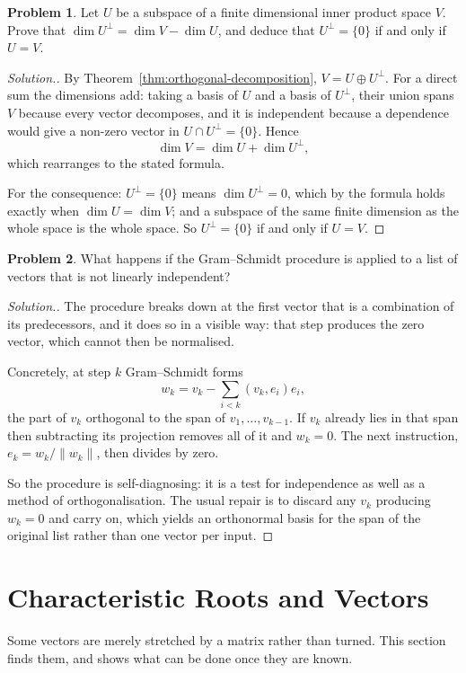 \documentclass[11pt,a4paper]{article}
\theoremstyle{definition}
\newtheorem{problemx}{Problem}[section]
\newenvironment{problem}{\begin{problemx}}{\end{problemx}}
\newenvironment{solution}
  {\renewcommand{\qedsymbol}{}\begin{proof}[\textit{Solution}.]}
  {\end{proof}}
\begin{document}
\begin{problem}
Let $U$ be a subspace of a finite dimensional inner product space $V$. Prove
that $\dim U^{\perp}=\dim V-\dim U$, and deduce that $U^{\perp}=\{0\}$ if and
only if $U=V$.
\end{problem}
\begin{solution}
By Theorem~\ref{thm:orthogonal-decomposition}, $V=U\oplus U^{\perp}$. For a
direct sum the dimensions add: taking a basis of $U$ and a basis of
$U^{\perp}$, their union spans $V$ because every vector decomposes, and it is
independent because a dependence would give a non-zero vector in
$U\cap U^{\perp}=\{0\}$. Hence
$$\dim V=\dim U+\dim U^{\perp},$$
which rearranges to the stated formula.

For the consequence: $U^{\perp}=\{0\}$ means $\dim U^{\perp}=0$, which by the
formula holds exactly when $\dim U=\dim V$; and a subspace of the same finite
dimension as the whole space is the whole space. So $U^{\perp}=\{0\}$ if and
only if $U=V$.
\end{solution}

\begin{problem}
What happens if the Gram--Schmidt procedure is applied to a list of vectors
that is not linearly independent?
\end{problem}
\begin{solution}
The procedure breaks down at the first vector that is a combination of its
predecessors, and it does so in a visible way: that step produces the zero
vector, which cannot then be normalised.

Concretely, at step $k$ Gram--Schmidt forms
$$w_k=v_k-\sum_{i<k}(v_k,e_i)e_i,$$
the part of $v_k$ orthogonal to the span of $v_1,\dots,v_{k-1}$. If $v_k$
already lies in that span then subtracting its projection removes all of it and
$w_k=0$. The next instruction, $e_k=w_k/\|w_k\|$, then divides by zero.

So the procedure is self-diagnosing: it is a test for independence as well as a
method of orthogonalisation. The usual repair is to discard any $v_k$ producing
$w_k=0$ and carry on, which yields an orthonormal basis for the span of the
original list rather than one vector per input.
\end{solution}

\pagebreak
\section{Characteristic Roots and Vectors}
Some vectors are merely stretched by a matrix rather than turned. This section
finds them, and shows what can be done once they are known.
\end{document}
